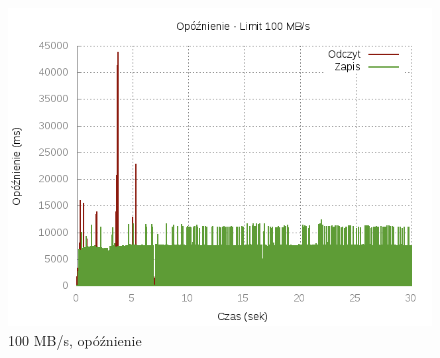 \begin{figure}[h]
	\centering
	\includegraphics[scale=0.9]{results/100_lat.png}
		\caption{100 MB/s, opóźnienie}
    \label{fig:100-lat}
\end{figure}


